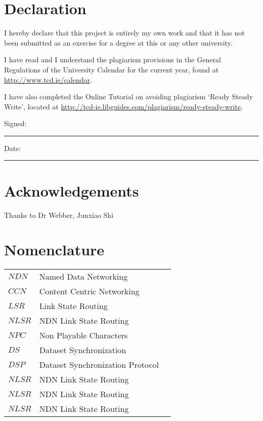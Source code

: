 \section*{Declaration}
\vspace{1cm}
I hereby declare that this project is entirely my own work and that it has not been submitted as an exercise for a degree at this or any other university.

\vspace{1cm}
I have read and I understand the plagiarism provisions in the General Regulations of the University Calendar for the current year, found at \url{http://www.tcd.ie/calendar}.
\vspace{1cm}

I have also completed the Online Tutorial on avoiding plagiarism `Ready Steady Write', located at
\url{http://tcd-ie.libguides.com/plagiarism/ready-steady-write}.
\vspace{3cm}

Signed:~\rule{5cm}{0.3pt}\hfill Date:~\rule{5cm}{0.3pt}

\newpage
\onehalfspacing

\section*{Acknowledgements}
Thanks to Dr Webber, Junxiao Shi

\tableofcontents
\listoffigures
\listoftables
\lstlistoflistings
\newpage


\section*{Nomenclature}
\begin{tabular}{lp{15cm}l}
    $NDN$ & Named Data Networking \\
    $CCN$ & Content Centric Networking \\
    $LSR$ & Link State Routing \\
    $NLSR$ & NDN Link State Routing \\
    $NPC$ & Non Playable Characters \\
    $DS$ & Dataset Synchronization \\
    $DSP$ & Dataset Synchronization Protocol \\
    $NLSR$ & NDN Link State Routing \\
    $NLSR$ & NDN Link State Routing \\
    $NLSR$ & NDN Link State Routing \\
\end{tabular}
\vspace{2cm}
